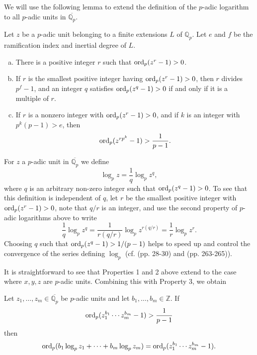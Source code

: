 We will use the following lemma to extend the definition of the $p$-adic logarithm to all $p$-adic units in $\overline{\mathbb{Q}_p}$. 
\begin{lemma} \label{lem: pAdicLogarithms}
Let $z$ be a $p$-adic unit belonging to a finite extensions $L$ of $\mathbb{Q}_p$. Let $e$ and $f$ be the ramification index and inertial degree of $L$. 
\begin{enumerate}[(a)]
\item There is a positive integer $r$ such that $\operatorname{ord}_p(z^r-1) >0$.
\item If $r$ is the smallest positive integer having $\operatorname{ord}_p(z^r-1) >0$, then $r$ divides $p^f-1$, and an integer $q$ satisfies $\operatorname{ord}_p(z^q-1) >0$ if and only if it is a multiple of $r$.
\item If $r$ is a nonzero integer with $\operatorname{ord}_p(z^r-1) >0$, and if $k$ is an integer with $p^k(p-1) > e$, then
\[\operatorname{ord}_p(z^{rp^k}-1) >\frac{1}{p-1}.\]
\end{enumerate}
\end{lemma}

For $z$ a $p$-adic unit in $\overline{\mathbb{Q}_p}$ we define
\[\log_p{z} = \frac{1}{q}\log_p{z^q},\]
where $q$ is an arbitrary non-zero integer such that $\operatorname{ord}_p(z^q-1) >0$. To see that this definition is independent of $q$, let $r$ be the smallest positive integer with $\operatorname{ord}_p(z^r-1) >0$, note that $q/r$ is an integer, and use the second property of $p$-adic logarithms above to write
\[\frac{1}{q}\log_p{z^q} = \frac{1}{r(q/r)}\log_p{z^{r(q/r)}} = \frac{1}{r}\log_p{z^r}.\]
Choosing $q$ such that $\operatorname{ord}_p(z^q-1) > 1/(p-1)$ helps to speed up and control the convergence of the series defining $\log_p$ (cf. \cite{Sm} (pp. 28-30) and \cite{Coh2} (pp. 263-265)).

It is straightforward to see that Properties 1 and 2 above extend to the case where $x,y,z$ are $p$-adic units. Combining this with Property 3, we obtain
\begin{lemma}\label{lem:pAdicLogarithms2}
Let $z_1, \dots, z_m \in \overline{\mathbb{Q}_p}$ be $p$-adic units and let $b_1, \dots, b_m \in \mathbb{Z}$. If 
\[\operatorname{ord}_p(z_1^{b_1}\cdots z_m^{b_m} - 1) > \frac{1}{p-1}\]
then 
\[\operatorname{ord}_p(b_1\log_p{z_1} + \cdots + b_m \log_p{z_m}) = \operatorname{ord}_p(z_1^{b_1}\cdots z_m^{b_m} - 1).\]
\end{lemma}


